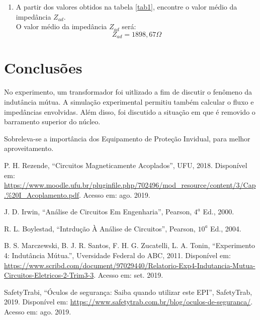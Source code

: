 \documentclass[a4paper,12pt,oneside,openany,table,xcdraw]{article}
\begin{document}
\begin{enumerate}[1 - ]
\item A partir dos valores obtidos na tabela \ref{tab1}, encontre o valor médio da impedância $Z_{ad}$.\\
O valor médio da impedância $Z_{ad}$ será:
$$Z_{ad}=1898,67\Omega$$
\end{enumerate}

\section{Conclusões} %
No experimento, um transformador foi uitlizado a fim de discutir o fenômeno da indutância mútua. A simulação experimental permitiu também calcular o fluxo e impedâncias envolvidas. Além disso, foi discutido a situação em que é removido o barramento superior do núcleo. 

Sobreleva-se a importância dos Equipamento de Proteção Invidual, para melhor aproveitamento.

\newpage
\begin{thebibliography}{9} 
    P. H. Rezende,
    “Circuitos Magneticamente Acoplados”, UFU, 2018.
 Disponível em:
 \url{https://www.moodle.ufu.br/pluginfile.php/702496/mod_resource/content/3/Cap.\%20I_Acoplamento.pdf}. Acesso em: ago. 2019.

    J. D. Irwin,
    “Análise de Circuitos Em Engenharia”, Pearson, $4^a$ Ed., 2000.

    R. L. Boylestad,
    “Intrdução À Análise de Circuitos”, Pearson, $10^a$ Ed., 2004.

    B. S. Marczewski, B. J. R. Santos, F. H. G. Zucatelli, L. A. Tonin,
    “Experimento 4: Indutância Mútua.”, Uversidade Federal do ABC, 2011.
 Disponível em:
 \url{https://www.scribd.com/document/97029440/Relatorio-Exp4-Indutancia-Mutua-Circuitos-Eletricos-2-Trim3-3}. Acesso em: set. 2019.

    SafetyTrabi,
    “Óculos de segurança: Saiba quando utilizar este EPI”, SafetyTrab, 2019.
 Disponível em:
 \url{https://www.safetytrab.com.br/blog/oculos-de-seguranca/}. Acesso em: ago. 2019.


\end{thebibliography}
\end{document}
